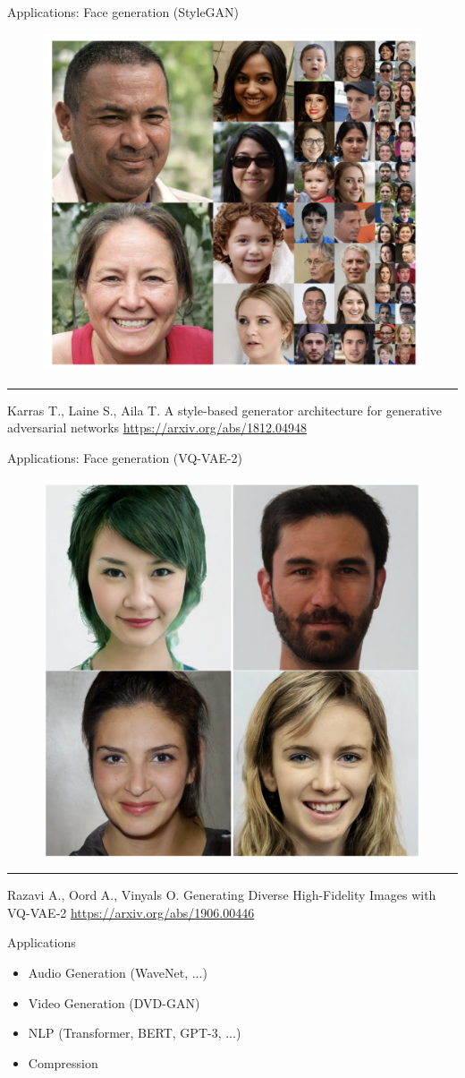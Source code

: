 \documentclass{beamer}
\begin{document}
\begin{frame}{Applications: Face generation (StyleGAN)}
    \begin{figure}
        \centering
        \includegraphics[width=0.65\linewidth]{figs/stylegan.png}
        \label{fig:stylegan}
    \end{figure}
\vfill
\hrule\medskip
{\scriptsize Karras T., Laine S., Aila T. A style-based generator architecture for generative adversarial networks  \href{https://arxiv.org/abs/1812.04948}{https://arxiv.org/abs/1812.04948}}
\end{frame}
\begin{frame}{Applications: Face generation (VQ-VAE-2)}
    \begin{figure}
        \centering
        \includegraphics[width=0.65\linewidth]{figs/vq_vae.png}
        \label{fig:vq_vae}
    \end{figure}
\vfill
\hrule\medskip
{\scriptsize Razavi A., Oord A., Vinyals O. Generating Diverse High-Fidelity Images with VQ-VAE-2 \href{https://arxiv.org/abs/1906.00446}{https://arxiv.org/abs/1906.00446}}
\end{frame}
\begin{frame}{Applications}
\begin{itemize}
    \item Audio Generation (WaveNet, ...)
    \item Video Generation (DVD-GAN)
    \item NLP (Transformer, BERT, GPT-3, ...)
    \item Compression
\end{itemize}
\end{frame}
\end{document}
